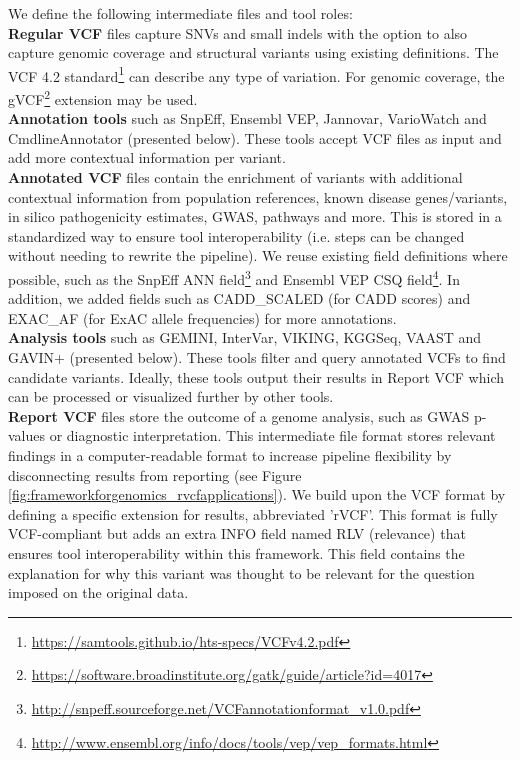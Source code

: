 \noindent We define the following intermediate files and tool roles: \\

\noindent\textbf{Regular VCF} files capture SNVs and small indels with the option to also capture genomic coverage and structural variants using existing definitions.
The VCF 4.2 standard\footnote{\url{https://samtools.github.io/hts-specs/VCFv4.2.pdf}} can describe any type of variation.
For genomic coverage, the gVCF\footnote{\url{https://software.broadinstitute.org/gatk/guide/article?id=4017}} extension may be used.\\

\noindent\textbf{Annotation tools} such as SnpEff\cite{Cingolani_2012}, Ensembl VEP\cite{McLaren_2010}, Jannovar\cite{J_ger_2014}, VarioWatch\cite{Cheng_2012} and CmdlineAnnotator (presented below).
These tools accept VCF files as input and add more contextual information per variant. \\

\noindent\textbf{Annotated VCF} files contain the enrichment of variants with additional contextual information from population references, known disease genes/variants, in silico pathogenicity estimates, GWAS, pathways and more.
This is stored in a standardized way to ensure tool interoperability (i.e. steps can be changed without needing to rewrite the pipeline).
We reuse existing field definitions where possible, such as the SnpEff ANN field\footnote{\url{http://snpeff.sourceforge.net/VCFannotationformat_v1.0.pdf}} and Ensembl VEP CSQ field\footnote{\url{http://www.ensembl.org/info/docs/tools/vep/vep_formats.html}}.
In addition, we added fields such as CADD\_\-SCALED (for CADD scores) and EXAC\_\-AF (for ExAC allele frequencies) for more annotations.\\

\noindent\textbf{Analysis tools} such as GE\-MI\-NI\cite{Paila_2013}, In\-ter\-Var\cite{Li_2017}, VI\-KING\cite{Miller_2015}, KGG\-Seq\cite{Li_2012}, VAAST\cite{Kennedy_2014} and GA\-VIN+ (presented below).
These tools filter and query annotated VCFs to find candidate variants.
Ideally, these tools output their results in Report VCF which can be processed or visualized further by other tools. \\

\noindent\textbf{Report VCF} files store the outcome of a genome analysis, such as GWAS p-values or diagnostic interpretation.
This intermediate file format stores relevant findings in a computer-readable format to increase pipeline flexibility by disconnecting results from reporting (see Figure \ref{fig:frameworkforgenomics_rvcfapplications}).
We build upon the VCF format by defining a specific extension for results, abbreviated 'rVCF'.
This format is fully VCF-compliant but adds an extra INFO field named RLV (relevance) that ensures tool interoperability within this framework.
This field contains the explanation for why this variant was thought to be relevant for the question imposed on the original data.

